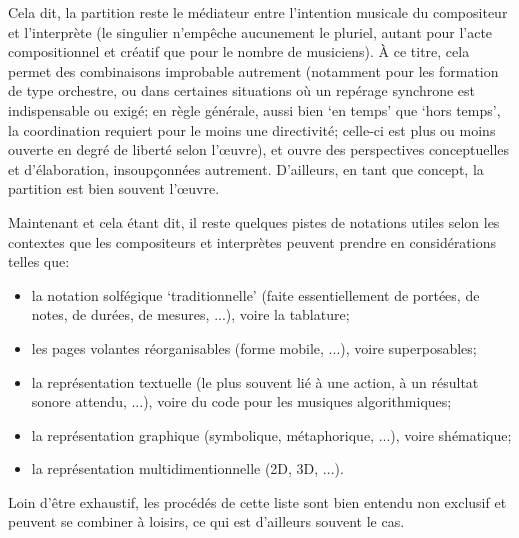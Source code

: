 \documentclass{article}
\begin{document}

Cela dit, la partition reste le médiateur entre l'intention musicale du compositeur et l'interprète (le singulier n'empêche aucunement le pluriel, autant pour l'acte compositionnel et créatif que pour le nombre de musiciens). À ce titre, cela permet des combinaisons improbable autrement (notamment pour les formation de type orchestre, ou dans certaines situations où un repérage synchrone est indispensable ou exigé; en règle générale, aussi bien `en temps' que `hors temps', la coordination requiert pour le moins une directivité; celle-ci est plus ou moins ouverte en degré de liberté selon l'œuvre), et ouvre des perspectives conceptuelles et d'élaboration, insoupçonnées autrement. D'ailleurs, en tant que concept, la partition est bien souvent l'œuvre.  

\bigskip

Maintenant et cela étant dit, il reste quelques pistes de notations utiles selon les contextes que les compositeurs et interprètes peuvent prendre en considérations telles que:

\begin{itemize}
\item la notation solfégique `traditionnelle' (faite essentiellement de portées, de notes, de durées, de mesures, ...), voire la tablature;
\item les pages volantes réorganisables  (forme mobile, ...), voire superposables;
\item la représentation textuelle (le plus souvent lié à une action, à un résultat sonore attendu, ...), voire du code pour les musiques algorithmiques;
\item la représentation graphique (symbolique, métaphorique, ...), voire shématique;
\item la représentation multidimentionnelle (2D, 3D, ...).
\end{itemize}

Loin d'être exhaustif, les procédés de cette liste sont bien entendu non exclusif et peuvent se combiner à loisirs, ce qui est d'ailleurs souvent le cas.
\end{document}
